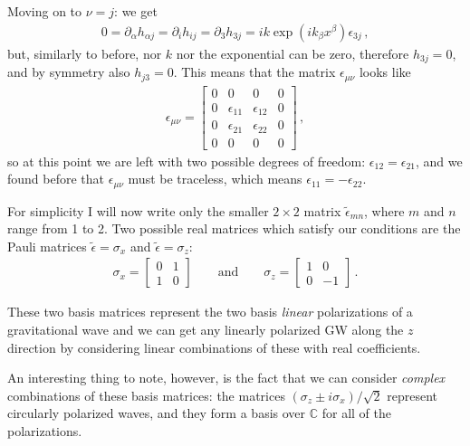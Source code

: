 \documentclass[main.tex]{subfiles}
\begin{document}
Moving on to \(\nu = j \): we get 
%
\begin{align}
0 = \partial_{\alpha } h_{\alpha j} = \partial_{i } h_{ij} = \partial_{3} h_{3 j} = ik \exp(ik_{\beta } x^{\beta } ) \epsilon_{3j}
\,,
\end{align}
%
but, similarly to before, nor \(k\) nor the exponential can be zero, therefore \(h_{3j}=0\), and by symmetry also \(h_{j3}=0\). This means that the matrix \(\epsilon_{\mu \nu }\) looks like 
%
\begin{align}
\epsilon_{\mu \nu } = \left[\begin{array}{cccc}
0 & 0 & 0 & 0 \\ 
0 & \epsilon_{11} & \epsilon_{12} & 0 \\ 
0 & \epsilon_{21} & \epsilon_{22} & 0 \\ 
0 & 0 & 0 & 0
\end{array}\right]
\,,
\end{align}
%
so at this point we are left with two possible degrees of freedom: \(\epsilon_{12} = \epsilon_{21}\), and we found before that \(\epsilon_{\mu \nu }\) must be traceless, which means \(\epsilon_{11} = - \epsilon_{22}\). 

For simplicity I will now write only the smaller \(2 \times 2\) matrix \(\widetilde{\epsilon}_{mn}\), where \(m\) and \(n\) range from 1 to 2. Two possible real matrices which satisfy our conditions are the Pauli matrices \(\widetilde{\epsilon}=   \sigma_{x} \) and \( \widetilde{\epsilon} = \sigma_{z}\): 
%
\begin{align}
\sigma_{x} = \left[\begin{array}{cc}
0 & 1 \\ 
1 & 0
\end{array}\right] \qquad \text{and} \qquad
\sigma_{z} = \left[\begin{array}{cc}
1 & 0 \\ 
0 & -1
\end{array}\right]
\,.
\end{align}

These two basis matrices represent the two basis \emph{linear} polarizations of a gravitational wave and we can get any linearly polarized GW along the \(z\) direction by considering linear combinations of these with real coefficients. 

An interesting thing to note, however, is the fact that we can consider \emph{complex} combinations of these basis matrices: the matrices \((\sigma_{z} \pm i \sigma_{x} ) / \sqrt{2}\) represent circularly polarized waves, and they form a basis over \(\mathbb{C}\) for all of the polarizations. 
\end{document}
